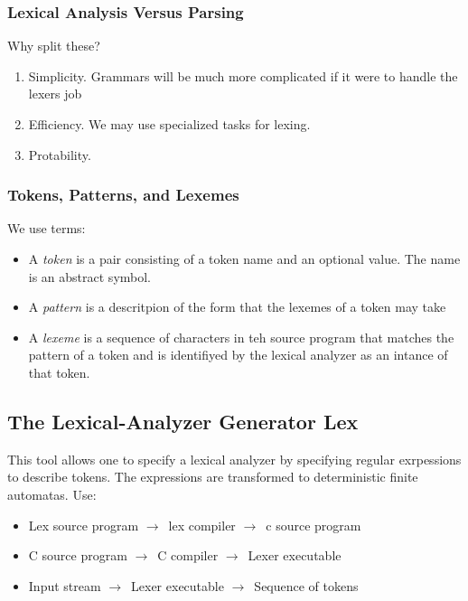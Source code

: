 \documentclass{article}
\newcommand{\ta}{$\to$~}
\begin{document}
\subsubsection{Lexical Analysis Versus Parsing} %
\label{ssub:Lexical Analysis Versus Parsing}
Why split these?
\begin{enumerate}
	\item Simplicity. Grammars will be much more complicated if it were to handle the lexers job
	\item Efficiency. We may use specialized tasks for lexing.
	\item Protability.
\end{enumerate}

\subsubsection{Tokens, Patterns, and Lexemes} %
\label{ssub:Tokens, Patterns, and Lexemes}
We use terms:
\begin{itemize}
	\item A \emph{token} is a pair consisting of a token name and an optional value. The name is an abstract symbol.
	\item A \emph{pattern} is a descritpion of the form that the lexemes of a token may take
	\item A \emph{lexeme} is a sequence of characters in teh source program that matches the pattern of a token and is identifiyed by the lexical analyzer as an intance of that token.
\end{itemize}


\subsection{The Lexical-Analyzer Generator Lex} %
\label{sub:The Lexical-Analyzer Generator Lex}
This tool allows one to specify a lexical analyzer by specifying regular exrpessions to describe tokens. The expressions are transformed to deterministic finite automatas. Use:
\begin{itemize}
	\item Lex source program \ta lex compiler \ta c source program
	\item C source program \ta C compiler \ta Lexer executable
	\item Input stream \ta Lexer executable \ta Sequence of tokens
\end{itemize}
\end{document}
